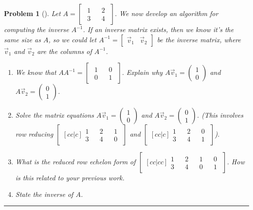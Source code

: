 \documentclass[letterpaper,oneside]{book}%
\theoremstyle{plain}
\theoremstyle{box}
\theoremstyle{problem}
\newtheorem{problemnum}{Problem}[chapter]
\newenvironment{problem}[1][]{\begin{problemnum}[#1]}{\end{problemnum}\nopagebreak\hrule\bigskip}
\newcommand{\pvec}[1]{\begin{pmatrix} #1 \end{pmatrix}}
\newcommand{\nvec}[1]{\begin{matrix} #1 \end{matrix}}
\begin{document}
\begin{problem}
Let 
$A=
\begin{bmatrix}
\nvec{1\\3}&
\nvec{2\\4}
\end{bmatrix}
.$
We now develop an algorithm for computing the inverse $A^{-1}$.
If an inverse matrix exists, then we know it's the same size as $A$, so we could let $A^{-1}=\begin{bmatrix}\vec v_1 & \vec v_2\end{bmatrix}$ be the inverse matrix, where $\vec v_1$ and $\vec v_2$ are the columns of $A^{-1}$.  
\begin{enumerate}
 \item  We know that $A A^{-1} = \begin{bmatrix}\nvec{1\\0}&\nvec{0\\1}\end{bmatrix}.$ 
Explain why $A\vec v_1=\pvec{1\\0}$ and $A\vec v_2=\pvec{0\\1}$.
 \item Solve the matrix equations $A\vec v_1=\pvec{1\\0}$ and $A\vec v_2=\pvec{0\\1}$.  (This involves row reducing 
$
\begin{bmatrix}[cc|c]
\nvec{1\\3}&
\nvec{2\\4}&
\nvec{1\\0}
\end{bmatrix}
$
and 
$
\begin{bmatrix}[cc|c]
\nvec{1\\3}&
\nvec{2\\4}&
\nvec{0\\1}
\end{bmatrix}
$).
 \item What is the reduced row echelon form of
$
\begin{bmatrix}[cc|cc]
\nvec{1\\3}&
\nvec{2\\4}&
\nvec{1\\0}&
\nvec{0\\1}
\end{bmatrix}
$.  How is this related to your previous work.
 \item State the inverse of $A$. 
\end{enumerate}

\end{problem}
\end{document}
